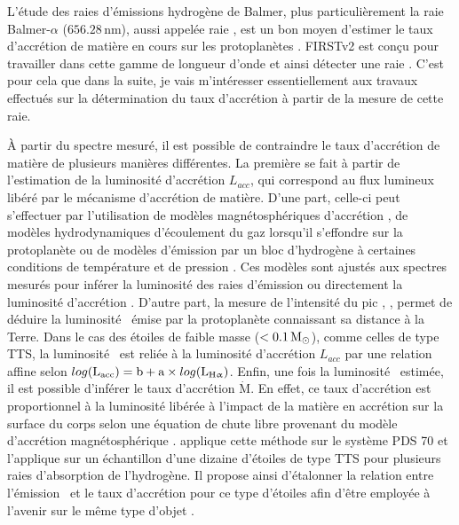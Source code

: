 L'étude des raies d'émissions hydrogène de Balmer, plus particulièrement la raie Balmer-$\alpha$ ($656.28 \,$nm), aussi appelée raie \ha, est un bon moyen d'estimer le taux d'accrétion de matière en cours sur les protoplanètes \citep{aoyama2019, marleau2022}. \ac{FIRSTv2} est conçu pour travailler dans cette gamme de longueur d'onde et ainsi détecter une raie \ha. C'est pour cela que dans la suite, je vais m'intéresser essentiellement aux travaux effectués sur la détermination du taux d'accrétion à partir de la mesure de cette raie.

À partir du spectre mesuré, il est possible de contraindre le taux d'accrétion de matière de plusieurs manières différentes. La première se fait à partir de l'estimation de la luminosité d'accrétion $L_{acc}$, qui correspond au flux lumineux libéré par le mécanisme d'accrétion de matière. D'une part, celle-ci peut s'effectuer par l'utilisation de modèles magnétosphériques d'accrétion \citep{natta2004, ingleby2013, thanathibodee2019}, de modèles hydrodynamiques d'écoulement du gaz lorsqu'il s'effondre sur la protoplanète \citep{aoyama2018, aoyama2019, aoyama2020} ou de modèles d'émission par un bloc d'hydrogène à certaines conditions de température et de pression \citep{alcala2017, rigliaco2012}. Ces modèles sont ajustés aux spectres mesurés pour inférer la luminosité des raies d'émission ou directement la luminosité d'accrétion \Lacc. D'autre part, la mesure de l'intensité du pic \ha, \Lha, permet de déduire la luminosité \ha~émise par la protoplanète connaissant sa distance à la Terre. Dans le cas des étoiles de faible masse ($< 0.1 \, \text{$\text{M}_{\odot}$}$), comme celles de type \ac{TTS}, la luminosité \Lha~est reliée à la luminosité d'accrétion $L_{acc}$ par une relation affine selon $log(\text{$\text{L}_{\text{acc}}$}) = \text{b} + \text{a} \times log(\text{$\text{L}_{\text{$\text{H}\upalpha$}}$})$. Enfin, une fois la luminosité \Lacc~estimée, il est possible d'inférer le taux d'accrétion $\dot{\text{M}}$. En effet, ce taux d'accrétion est proportionnel à la luminosité libérée à l'impact de la matière en accrétion sur la surface du corps selon une équation de chute libre provenant du modèle d'accrétion magnétosphérique \citep{gullbring1998}. \cite{wagner2018} applique cette méthode sur le système PDS 70 et \cite{rigliaco2012} l'applique sur un échantillon d'une dizaine d'étoiles de type \ac{TTS} pour plusieurs raies d'absorption de l'hydrogène. Il propose ainsi d'étalonner la relation entre l'émission \ha~et le taux d'accrétion pour ce type d'étoiles afin d'être employée à l'avenir sur le même type d'objet \citep{close2014}.

